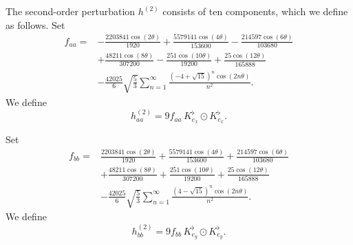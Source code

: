 \documentclass[11pt]{amsart}
\theoremstyle{definition}
\begin{document}
The second-order perturbation $h^{(2)}$ consists of ten components, which we define as follows.
Set
\begin{equation*}\label{def.faa}
\begin{split}
f_{aa}=&-\frac{2203841 \cos (2 \theta )}{1920}+\frac{5579141 \cos (4
   \theta )}{153600}-\frac{214597 \cos (6 \theta
   )}{103680}\\
   &+\frac{48211 \cos (8 \theta )}{307200}-\frac{251
   \cos (10 \theta )}{19200}+\frac{25 \cos (12 \theta
   )}{165888}\\
   &-\frac{42025}{6} \sqrt{\frac{5}{3}}\sum_{n=1}^{\infty}\frac{(-4+\sqrt{15})^n\cos(2n\theta)}{n^2}.
\end{split}
\end{equation*}
We define
\begin{equation*}\label{def.haa}
h^{(2)}_{aa}=9 f_{aa}\, K^\flat_{e_x}\odot K^\flat_{e_x}.
\end{equation*}

Set
\begin{equation*}
\begin{split}
f_{bb}=&\frac{2203841 \cos (2 \theta )}{1920}+\frac{5579141 \cos (4
   \theta )}{153600}+\frac{214597 \cos (6 \theta
   )}{103680}\\
   &+\frac{48211 \cos (8 \theta )}{307200}+\frac{251
   \cos (10 \theta )}{19200}+\frac{25 \cos (12 \theta
   )}{165888}\\
   &-\frac{42025}{6} \sqrt{\frac{5}{3}}
   \sum_{n=1}^\infty \frac{(4-\sqrt{15})^n \cos(2n\theta)}{n^2}.
\end{split}
\end{equation*}
We define
\begin{equation*}\label{def.hbb}
h^{(2)}_{bb}=9 f_{bb}\, K^\flat_{e_y}\odot K^\flat_{e_y}.
\end{equation*}
\end{document}
